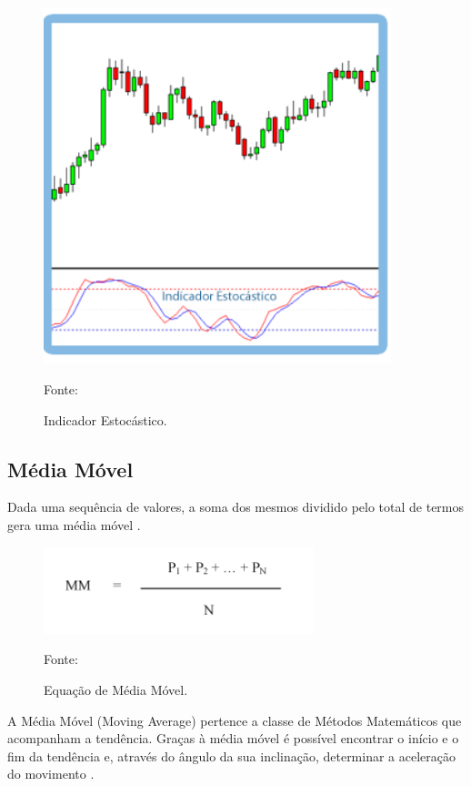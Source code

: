 \begin{figure}[H]
\centering
\includegraphics[width=0.9\textwidth]{figuras/estocastico}
\caption{Indicador Estocástico.}{Fonte: } 
\label{estocastico}
\end{figure}

\subsection{Média Móvel}

Dada uma sequência de valores, a soma dos mesmos dividido pelo total de termos gera uma média móvel \cite{wolfram}.

\begin{figure}[H]
\centering
\includegraphics[width=0.7\textwidth]{figuras/equacaoMedia}
\caption{Equação de Média Móvel.}{Fonte: } 
\label{equacaoMedia}
\end{figure}

A Média Móvel (Moving Average) pertence a classe de Métodos Matemáticos que acompanham a tendência. Graças à média móvel é possível encontrar o início e o fim da tendência e, através do ângulo da sua inclinação, determinar a aceleração do movimento \cite{roboforex}.

